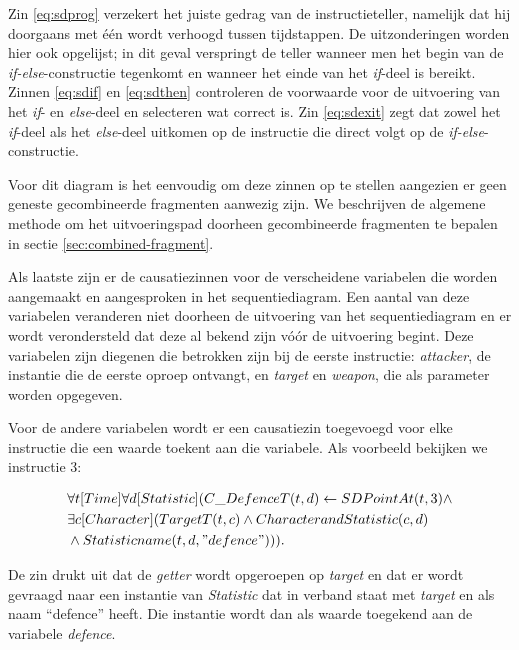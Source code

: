 Zin \ref{eq:sdprog} verzekert het juiste gedrag van de instructieteller, namelijk dat hij doorgaans met \'e\'en wordt verhoogd tussen tijdstappen. De uitzonderingen worden hier ook opgelijst; in dit geval verspringt de teller wanneer men het begin van de \textit{if-else}-constructie tegenkomt en wanneer het einde van het \textit{if}-deel is bereikt. Zinnen \ref{eq:sdif} en \ref{eq:sdthen} controleren de voorwaarde voor de uitvoering van het \textit{if}- en \textit{else}-deel en selecteren wat correct is. Zin \ref{eq:sdexit} zegt dat zowel het \textit{if}-deel als het \textit{else}-deel uitkomen op de instructie die direct volgt op de \textit{if-else}-constructie.

Voor dit diagram is het eenvoudig om deze zinnen op te stellen aangezien er geen geneste gecombineerde fragmenten aanwezig zijn. We beschrijven de algemene methode om het uitvoeringspad doorheen gecombineerde fragmenten te bepalen in sectie \ref{sec:combined-fragment}.

\parbreak

Als laatste zijn er de causatiezinnen voor de verscheidene variabelen die worden aangemaakt en aangesproken in het sequentiediagram. Een aantal van deze variabelen veranderen niet doorheen de uitvoering van het sequentiediagram en er wordt verondersteld dat deze al bekend zijn v\'o\'or de uitvoering begint. Deze variabelen zijn diegenen die betrokken zijn bij de eerste instructie: \textit{attacker}, de instantie die de eerste oproep ontvangt, en \textit{target} en \textit{weapon}, die als parameter worden opgegeven.

Voor de andere variabelen wordt er een causatiezin toegevoegd voor elke instructie die een waarde toekent aan die variabele. Als voorbeeld bekijken we instructie 3:

\begin{align*}
	&\forall{t}[Time]\forall{d}[Statistic](C\_DefenceT(t, d) \leftarrow SDPointAt(t, 3) \land \\ &\exists{c}[Character](TargetT(t, c) \land CharacterandStatistic(c, d) \\ &\land Statisticname(t, d, "defence"))).
\end{align*}


De zin drukt uit dat de \textit{getter} wordt opgeroepen op \textit{target} en dat er wordt gevraagd naar een instantie van \textit{Statistic} dat in verband staat met \textit{target} en als naam ``defence'' heeft. Die instantie wordt dan als waarde toegekend aan de variabele \textit{defence}.

